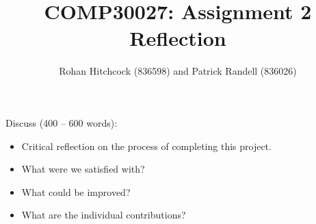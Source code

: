 \documentclass[11pt]{article}
\begin{document}
\title{\textbf{COMP30027: Assignment 2 Reflection}}
\author{Rohan Hitchcock (836598) and Patrick Randell (836026)}
\date{}
\maketitle

Discuss (400 -- 600 words):
\begin{itemize}
    \item Critical reflection on the process of completing this project.
    \item What were we satisfied with?
    \item What could be improved?
    \item What are the individual contributions?
\end{itemize}
\end{document}
